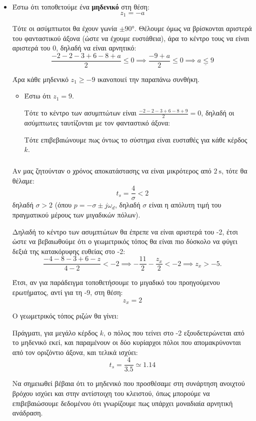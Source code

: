 \documentclass[11pt,a4paper,notitlepage,fleqn]{article}
\begin{document}
\begin{exercise}
\begin{itemize}
	\item Έστω ότι τοποθετούμε ένα \textbf{μηδενικό} στη θέση:
	\[
	z_1 = -a
	\]
	
	Τότε οι ασύμπτωτοι θα έχουν γωνία \( \pm \ang{90} \). Θέλουμε όμως να βρίσκονται
	αριστερά του φανταστικού άξονα (ώστε να έχουμε ευστάθεια), άρα το κέντρο τους
	να είναι αριστερά του 0, δηλαδή να είναι αρνητικό:
	\[
	\frac{-2-2-3+6-8+a}{2} \leq 0\implies \frac{-9+a}{2} \leq 0 \implies \underline{a \leq 9}
	\]
	
	Άρα κάθε μηδενικό \( z_1 \geq -9 \) ικανοποιεί την παραπάνω συνθήκη.
	
	\begin{itemize}
		\item Έστω ότι \( z_1 = 9 \).
		
		Τότε το κέντρο των ασυμπτώτων είναι
		\( \frac{-2-2-3+6-8+9}{2} = 0 \), δηλαδή οι ασύμπτωτες ταυτίζονται με
		τον φανταστικό άξονα:
		
		Τότε επιβεβαιώνουμε πως όντως το σύστημα είναι ευσταθές για κάθε κέρδος \( k \).
	\end{itemize}
	
	\subparagraph{}
	Αν μας ζητούνταν ο χρόνος αποκατάστασης να είναι μικρότερος από \( \SI{2}{\second} \),
	τότε θα θέλαμε:
	\[
	t_s = \frac{4}{σ} < 2
	\]
	δηλαδή \( σ > 2 \) (όπου \( p=-σ\pm j\omega_d \), δηλαδή \( σ \) είναι η απόλυτη τιμή
	του πραγματικού μέρους των μιγαδικών πόλων).
	
	Δηλαδή το κέντρο των ασυμπτώτων θα έπρεπε να είναι αριστερά του -2, έτσι ώστε να
	βεβαιωθούμε ότι ο γεωμετρικός τόπος θα είναι πιο δύσκολο να φύγει δεξιά της κατακόρυφης
	ευθείας στο -2:
	\[
	\frac{-4-8-3+6-z}{4-2} < -2 \implies -\frac{11}{2}-\frac{z_x}{2} < -2
	\implies z_x > -5.
	\]
	
	Έτσι, αν για παράδειγμα τοποθετήσουμε το μιγαδικό του προηγούμενου ερωτήματος, αντί
	για τη -9, στη θέση:
	\[
	z_x = 2
	\]
	
	Ο γεωμετρικός τόπος ριζών θα γίνει:
	
	Πράγματι, για μεγάλο κέρδος \( k \), ο πόλος που τείνει στο -2 εξουδετερώνεται από
	το μηδενικό εκεί, και παραμένουν οι δύο κυρίαρχοι πόλοι που απομακρύνονται από τον
	οριζόντιο άξονα, και τελικά ισχύει:
	\[
	t_s = \frac{4}{3.5} \simeq 1.14
	\]
	
	Να σημειωθεί βέβαια ότι το μηδενικό που προσθέσαμε στη συνάρτηση ανοιχτού βρόχου ισχύει
	και στην αντίστοιχη του κλειστού, όπως μπορούμε να επιβεβαιώσουμε δεδομένου ότι γνωρίζουμε
	πως υπάρχει μοναδιαία αρνητική ανάδραση.
\end{itemize}

\end{exercise}
\end{document}
